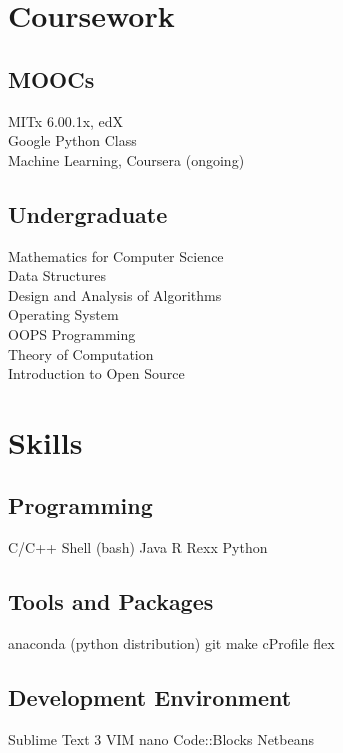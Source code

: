 \documentclass[]{deedy-resume-openfont}
\begin{document}
\begin{minipage}[t]{0.33\textwidth}

\section{Coursework}
\subsection{MOOCs}
MITx 6.00.1x, edX \\
Google Python Class \\
Machine Learning, Coursera (ongoing)\\
\sectionsep

\subsection{Undergraduate}
Mathematics for Computer Science \\
Data Structures \\
Design and Analysis of Algorithms \\
Operating System \\
OOPS Programming \\
Theory of Computation \\
Introduction to Open Source \\
\sectionsep


\section{Skills}
\subsection{Programming}
\textbullet{} C/C++ \textbullet{} Shell (bash) \textbullet{} Java \textbullet{} R \textbullet{} Rexx
\textbullet{}Python
\subsection{Tools and Packages}
\textbullet{} anaconda (python distribution) \textbullet{} git \textbullet{} make \textbullet{} cProfile \textbullet{} flex
\subsection{Development Environment}
\textbullet{} Sublime Text 3 \textbullet{} VIM \textbullet{} nano \textbullet{} Code::Blocks \textbullet{} Netbeans
\sectionsep

%
%

\end{minipage}
\end{document}
